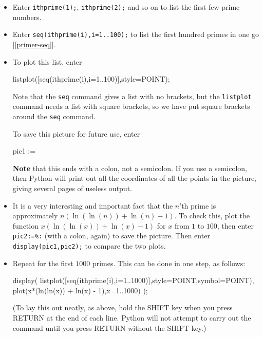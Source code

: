 \documentclass[a4paper,10pt]{amsbook}
\begin{document}
\begin{exercise}\label{ex-plotprimes}
 \begin{itemize}
  \item[(a)] Enter \verb~ithprime(1);~, \verb~ithprime(2);~ and so on
   to list the first few prime numbers. 
  \item[(b)] Enter \verb~seq(ithprime(i),i=1..100);~ to list the first
   hundred primes in one go [\ref{primer-seq}]. 
  \item[(c)] To plot this list, enter 
\begin{pcodeblock}
  listplot([seq(ithprime(i),i=1..100)],style=POINT);
\end{pcodeblock}
   Note that the \verb~seq~ command gives a list with no
   brackets, but the \verb~listplot~ command needs a list
   with square brackets, so we have put square brackets
   around the \verb~seq~ command.

   To save this picture for future use, enter 
\begin{pcodeblock}
  pic1 := %
\end{pcodeblock}
   \textbf{Note} that this ends with a colon, not a semicolon.  If you
   use a semicolon, then Python will print out all the coordinates of
   all the points in the picture, giving several pages of useless
   output.  
 \item[(d)] It is a very interesting and important fact that the $n$'th
  prime is approximately $n(\ln(\ln(n))+\ln(n)-1)$.  To check this,
  plot the function $x(\ln(\ln(x))+\ln(x)-1)$ for $x$ from $1$ to
  $100$, then enter \verb~pic2:=%:~
  (with a colon, again) to save the picture.  Then enter
  \verb~display(pic1,pic2);~ to compare the two plots. 
 \item[(e)] Repeat for the first $1000$ primes.  This can be done in
  one step, as follows:
\begin{pcodeblock}
   display(
    listplot([seq(ithprime(i),i=1..1000)],style=POINT,symbol=POINT),
    plot(x*(ln(ln(x)) + ln(x) - 1),x=1..1000)
   );
\end{pcodeblock}
  (To lay this out neatly, as above, hold the SHIFT key when you press
  RETURN at the end of each line.  Python will not attempt to carry out
  the command until you press RETURN without the SHIFT key.) 
 \end{itemize}
\end{exercise}
\end{document}
